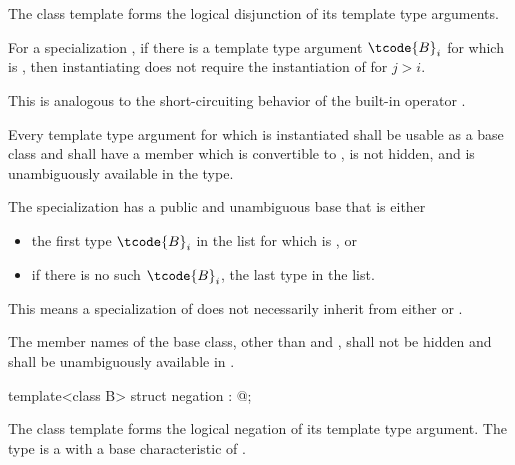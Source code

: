 \begin{itemdescr}
\pnum
The class template 
forms the logical disjunction of its template type arguments.

\pnum
For a specialization ,
if there is a template type argument $\tcode{B}_{i}$
for which  is ,
then instantiating 
does not require the instantiation of  for $j > i$.
\begin{note} This is analogous to the short-circuiting behavior of
the built-in operator \tcode{||}.
\end{note}

\pnum
Every template type argument
for which  is instantiated
shall be usable as a base class and
shall have a member  which
is convertible to ,
is not hidden, and
is unambiguously available in the type.

\pnum
The specialization 
has a public and unambiguous base that is either
\begin{itemize}
\item the first type $\tcode{B}_{i}$ in the list 
for which  is , or
\item if there is no such $\tcode{B}_{i}$, the last type in the list.
\end{itemize}
\begin{note} This means a specialization of 
does not necessarily inherit from
either  or .
\end{note}

\pnum
The member names of the base class,
other than  and ,
shall not be hidden and shall be unambiguously available in .
\end{itemdescr}

%
\begin{itemdecl}
template<class B> struct negation : @\seebelow@ { };
\end{itemdecl}

\begin{itemdescr}
\pnum
The class template 
forms the logical negation of its template type argument.
The type 
is a  with a base characteristic of .
\end{itemdescr}

